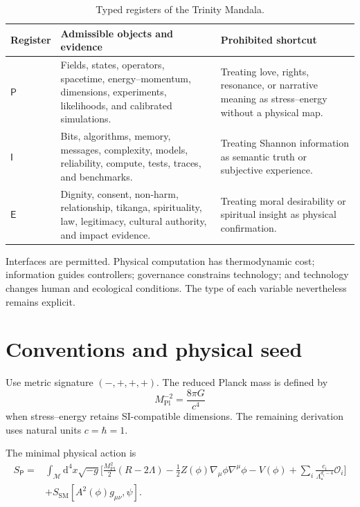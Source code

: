 \documentclass[11pt]{article}
\newcommand{\Mpl}{M_{\mathrm{Pl}}}
\newcommand{\dd}{\mathrm{d}}
\begin{document}
\begin{table}[ht]
\centering
\small
\begin{tabularx}{\linewidth}{>{\bfseries}p{0.65in} X X}
\toprule
Register & Admissible objects and evidence & Prohibited shortcut \\
\midrule
$\mathsf{P}$ & Fields, states, operators, spacetime, energy--momentum, dimensions, experiments, likelihoods, and calibrated simulations. & Treating love, rights, resonance, or narrative meaning as stress--energy without a physical map. \\
$\mathsf{I}$ & Bits, algorithms, memory, messages, complexity, models, reliability, compute, tests, traces, and benchmarks. & Treating Shannon information as semantic truth or subjective experience. \\
$\mathsf{E}$ & Dignity, consent, non-harm, relationship, tikanga, spirituality, law, legitimacy, cultural authority, and impact evidence. & Treating moral desirability or spiritual insight as physical confirmation. \\
\bottomrule
\end{tabularx}
\caption{Typed registers of the Trinity Mandala.}
\end{table}

Interfaces are permitted. Physical computation has thermodynamic cost; information guides controllers; governance constrains technology; and technology changes human and ecological conditions. The type of each variable nevertheless remains explicit.

\section{Conventions and physical seed}

Use metric signature $(-,+,+,+)$. The reduced Planck mass is defined by
\begin{equation}
\Mpl^{-2}=\frac{8\pi G}{c^4}
\end{equation}
when stress--energy retains SI-compatible dimensions. The remaining derivation uses natural units $c=\hbar=1$.

The minimal physical action is
\begin{align}
S_{\mathsf P}={}&\int_{\mathcal M}\dd^4x\sqrt{-g}\bigg[
\frac{\Mpl^2}{2}(R-2\Lambda)
-\frac12 Z(\phi)\nabla_\mu\phi\nabla^\mu\phi
-V(\phi)
+\sum_i\frac{c_i}{\Lambda_\star^{d_i-4}}\mathcal O_i
\bigg]\nonumber\\
&+S_{\mathrm{SM}}\!\left[A^2(\phi)g_{\mu\nu},\psi\right].
\label{eq:action}
\end{align}
\end{document}
